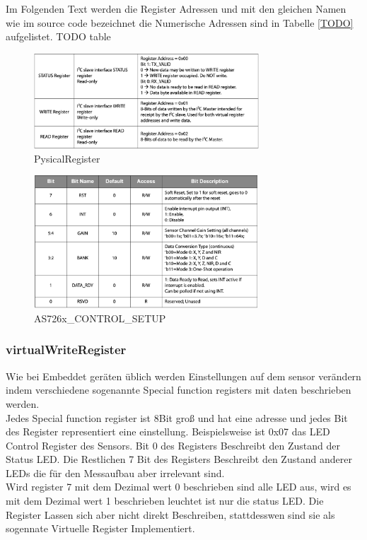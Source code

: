 Im Folgenden Text werden die Register Adressen und mit den gleichen Namen wie im source code bezeichnet die Numerische Adressen sind in Tabelle \ref{TODO} aufgelistet. TODO table

\begin{figure}[H]
\centering
\includegraphics[width=0.75\textwidth]{img/PysicalRegister}
\caption{PysicalRegister}
\label{fig:Seitenasicht-AS726X}
\end{figure}

\begin{figure}[H]
\centering
\includegraphics[width=0.75\textwidth]{img/ControlRegister_2}
\caption{AS726x\_CONTROL\_SETUP}
\label{fig:Seitenasicht-AS726X}
\end{figure}

\subsubsection{virtualWriteRegister}
Wie bei Embeddet geräten üblich werden Einstellungen auf dem sensor verändern indem verschiedene sogenannte Special function registers  mit daten beschrieben werden.\\
Jedes Special function register ist 8Bit groß und hat eine adresse und
jedes Bit des Register representiert eine einstellung.
Beispielsweise ist 0x07 das LED Control Register des Sensors.
Bit 0 des Registers Beschreibt den Zustand der Status LED.
Die Restlichen 7 Bit des Registers Beschreibt den Zustand anderer LEDs die für den Messaufbau aber irrelevant sind.\\
Wird register 7 mit dem Dezimal wert 0 beschrieben sind alle LED aus, wird es mit dem Dezimal wert 1 beschrieben leuchtet ist nur die status LED.
Die Register Lassen sich aber nicht direkt Beschreiben, stattdesswen sind sie als sogennate Virtuelle Register Implementiert.

